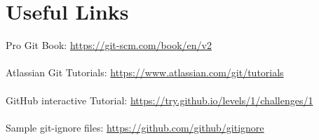 \documentclass{beamer}
\begin{document}
\section{Useful Links}
\begin{frame}{\secname}
     Pro Git Book:
    \url{https://git-scm.com/book/en/v2} \\~\\   
    
    Atlassian Git Tutorials:
    \url{https://www.atlassian.com/git/tutorials} \\~\\

    GitHub interactive Tutorial:
    \url{https://try.github.io/levels/1/challenges/1} \\~\\

    Sample git-ignore files:
    \url{https://github.com/github/gitignore}
\end{frame}
\end{document}
